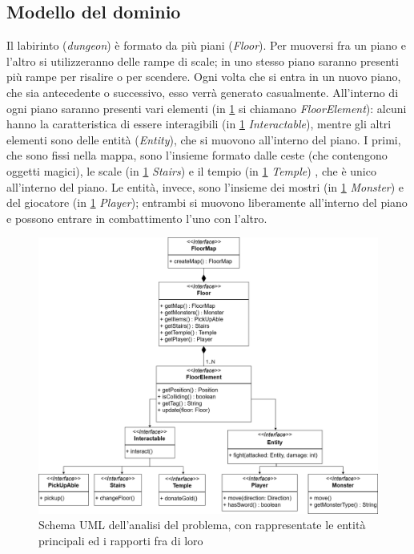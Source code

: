 \documentclass{report}
\begin{document}
\subsection{Modello del dominio}

Il labirinto (\textit{dungeon}) è formato da più piani (\textit{Floor}). 
%
Per muoversi fra un piano e l’altro si utilizzeranno delle rampe di scale; in uno stesso piano saranno presenti più rampe per risalire o per scendere. 
%
Ogni volta che si entra in un nuovo piano, che sia antecedente o successivo, esso verrà generato casualmente. 
%
All’interno di ogni piano saranno presenti vari elementi (in \ref{img:DiagrammaUMLAnalisi} si chiamano \textit{FloorElement}): alcuni hanno la caratteristica di essere interagibili (in \ref{img:DiagrammaUMLAnalisi} \textit{Interactable}), mentre gli altri elementi sono delle entità (\textit{Entity}), che si muovono all’interno del piano. 
%
I primi, che sono fissi nella mappa, sono l’insieme formato dalle ceste (che contengono oggetti magici), le scale (in \ref{img:DiagrammaUMLAnalisi} \textit{Stairs}) e il tempio (in \ref{img:DiagrammaUMLAnalisi} \textit{Temple}) , che è unico all’interno del piano. 
%
Le entità, invece, sono l’insieme dei mostri (in \ref{img:DiagrammaUMLAnalisi} \textit{Monster}) e del giocatore (in \ref{img:DiagrammaUMLAnalisi} \textit{Player}); entrambi si muovono liberamente all’interno del piano e possono entrare in combattimento l’uno con l’altro. 

\begin{figure}
    \centering
    \includegraphics[width=12cm]{DiagrammaAnalisi.drawio.png}
    \caption{Schema UML dell'analisi del problema, con rappresentate le entità principali ed i rapporti fra di loro}
    \label{img:DiagrammaUMLAnalisi}
\end{figure}
\end{document}
